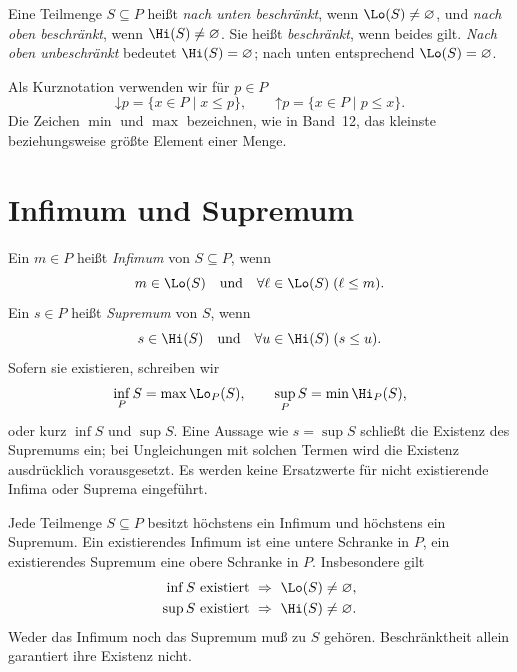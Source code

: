 \begin{definition}[Beschränktheit]\label{b13guide:def:bounded}
Eine Teilmenge $S\subseteq P$ heißt \emph{nach unten beschränkt},
wenn $\Lo(S)\ne\varnothing$, und \emph{nach oben beschränkt},
wenn $\Hi(S)\ne\varnothing$. Sie heißt \emph{beschränkt}, wenn
beides gilt. \emph{Nach oben unbeschränkt} bedeutet
$\Hi(S)=\varnothing$; nach unten entsprechend $\Lo(S)=\varnothing$.
\end{definition}

Als Kurznotation verwenden wir für $p\in P$
\[
 \mathord\downarrow p=\{x\in P\mid x\leq p\},\qquad
 \mathord\uparrow p=\{x\in P\mid p\leq x\}.
\]
Die Zeichen $\min$ und $\max$ bezeichnen, wie in Band~12,
das kleinste beziehungsweise größte Element einer Menge.

\section{Infimum und Supremum}

\begin{definition}\label{b13guide:def:extrema}
Ein $m\in P$ heißt \emph{Infimum} von $S\subseteq P$, wenn
\[
 m\in\Lo(S)\quad\text{und}\quad
 \forall \ell\in\Lo(S)\;(\ell\leq m).
\]
Ein $s\in P$ heißt \emph{Supremum} von $S$, wenn
\[
 s\in\Hi(S)\quad\text{und}\quad
 \forall u\in\Hi(S)\;(s\leq u).
\]
Sofern sie existieren, schreiben wir
\[
 \inf_P S=\max\Lo_P(S),\qquad
 \sup_P S=\min\Hi_P(S),
\]
oder kurz $\inf S$ und $\sup S$.
Eine Aussage wie $s=\sup S$ schließt die Existenz des Supremums ein;
bei Ungleichungen mit solchen Termen wird die Existenz ausdrücklich
vorausgesetzt. Es werden keine Ersatzwerte für nicht existierende
Infima oder Suprema eingeführt.
\end{definition}

\begin{theorem}
\label{b13guide:thm:unique}
Jede Teilmenge $S\subseteq P$ besitzt höchstens ein Infimum und
höchstens ein Supremum. Ein existierendes Infimum ist eine untere
Schranke in $P$, ein existierendes Supremum eine obere Schranke in $P$.
Insbesondere gilt
\[
\begin{aligned}
 \inf S\text{ existiert}&\ \Rightarrow\ \Lo(S)\ne\varnothing,\\
 \sup S\text{ existiert}&\ \Rightarrow\ \Hi(S)\ne\varnothing.
\end{aligned}
\]
Weder das Infimum noch das Supremum muß zu $S$ gehören.
Beschränktheit allein garantiert ihre Existenz nicht.
\end{theorem}

